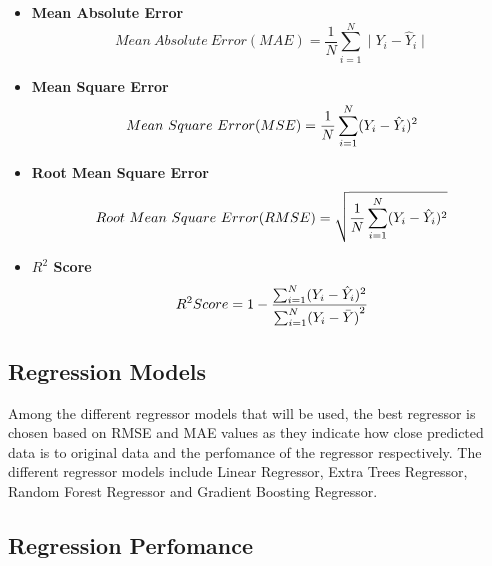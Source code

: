 \documentclass[12pt,letter-paper]{article}
\begin{document}
        \begin{itemize}
        
            \item\textbf{Mean Absolute Error}
            \begin{equation}
                Mean\ Absolute\ Error(MAE) =  \frac{1}{N}\sum_{i=1}^{N}\mid Y_i - \hat Y_i\mid
            \end{equation}
                
            \item\textbf{Mean Square Error}
            \begin{equation}
                Mean\ Square\ Error(MSE) =  \frac{1}{N}\sum_{i=1}^{N}(Y_i - \hat Y_i)\\^2
            \end{equation}
            
            \item\textbf{Root Mean Square Error}
            \begin{equation}
                Root\ Mean\ Square\ Error(RMSE) =  \sqrt{\frac{1}{N}\sum_{i=1}^{N}(Y_i - \hat Y_i)\\^2}
            \end{equation}
                
            \item\textbf{$R^2$ Score}
            \begin{equation}
                R^2 Score = 1 - \frac{\sum_{i=1}^{N}(Y_i - \hat Y_i)\\^2}{\sum_{i = 1}^{N}({Y_i - \bar{Y})}^2}
            
            \end{equation}
        \end{itemize}
        
    \subsection{Regression Models}
    
        Among the different regressor models that will be used, the best regressor is chosen based on RMSE and MAE values as they indicate how close predicted data is to original data and the perfomance of the regressor respectively. The different regressor models include Linear Regressor, Extra Trees Regressor, Random Forest Regressor and Gradient Boosting Regressor.
     
    \subsection{Regression Perfomance}
    
\end{document}
